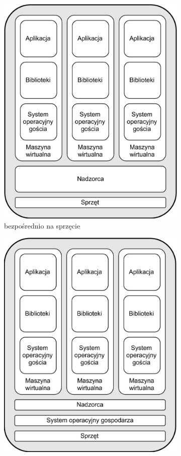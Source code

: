 \begin{figure}[ht]
    \begin{subfigure}{0.5\textwidth}
        \includegraphics[width=0.9\linewidth]{images/hardwareVM.png}
        \caption{bezpośrednio na sprzęcie}
        \label{fig:hardwareVM}
    \end{subfigure}
    \begin{subfigure}{0.5\textwidth}
        \includegraphics[width=0.9\linewidth]{images/OSVM.png}

\end{subfigure}
\end{figure}
